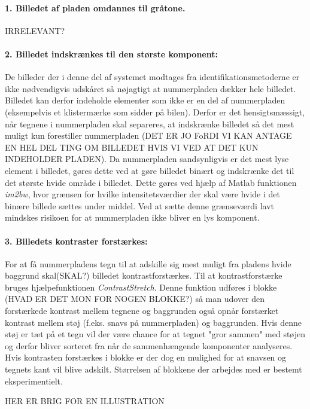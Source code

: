 \paragraph{1. Billedet af pladen omdannes til gråtone.} IRRELEVANT?

\paragraph{2. Billedet indskrænkes til den største komponent:}
De billeder der i denne del af systemet modtages fra identifikationsmetoderne er ikke nødvendigvis udskåret så nøjagtigt at nummerpladen dækker hele billedet. Billedet kan derfor indeholde elementer som ikke er en del af nummerpladen (eksempelvis et klistermærke som sidder på bilen). Derfor er det hensigtsmæssigt, når tegnene i nummerpladen skal separeres, at indskrænke billedet så det mest muligt kun forestiller nummerpladen (DET ER JO FoRDI VI KAN ANTAGE EN HEL DEL TING OM BILLEDET HVIS VI VED AT DET KUN INDEHOLDER PLADEN). Da nummerpladen sandsynligvis er det mest lyse element i billedet, gøres dette ved at gøre billedet binært og indskrænke det til det største hvide område i billedet. Dette gøres ved hjælp af Matlab funktionen \textit{im2bw}, hvor grænsen for hvilke intensitetsværdier der skal være hvide i det binære billede sættes under middel. Ved at sætte denne grænseværdi lavt mindskes risikoen for at nummerpladen ikke bliver en lys komponent.

\paragraph{3. Billedets kontraster forstærkes:}
For at få nummerpladens tegn til at adskille sig mest muligt fra pladens hvide baggrund skal(SKAL?) billedet kontrastforstærkes. Til at kontrastforstærke bruges hjælpefunktionen \textit{ContrastStretch}. Denne funktion udføres i blokke (HVAD ER DET MON FOR NOGEN BLOKKE?) så man udover den forstærkede kontrast mellem tegnene og baggrunden også opnår forstærket kontrast mellem støj (f.eks. snavs på nummerpladen) og baggrunden. Hvis denne støj er tæt på et tegn vil der være chance for at tegnet "gror sammen" med støjen og derfor bliver sorteret fra når de sammenhængende komponenter analyseres. Hvis kontrasten forstærkes i blokke er der dog en mulighed for at snavsen og tegnets kant vil blive adskilt. Størrelsen af blokkene der arbejdes med er bestemt eksperimentielt.

HER ER BRIG FOR EN ILLUSTRATION

